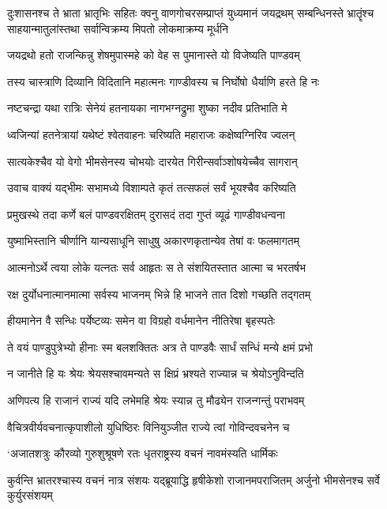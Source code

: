 दुःशासनश्च ते भ्राता भ्रातृभिः सहितः क्वनु
\threelineshloka
{वाणगोचरसम्प्राप्तं युध्यमानं जयद्रथम्}
{सम्बन्धिनस्ते भ्रातॄंश्च साहयान्मातुलांस्तथा}
{सर्वान्विक्रम्य मिपतो लोकमाक्रम्य मूर्धनि}


\twolineshloka
{जयद्रथो हतो राजन्किन्नु शेषमुपास्महे}
{को वेह स पुमानास्ते यो विजेष्यति पाण्डवम्}


\twolineshloka
{तस्य चास्त्राणि दिव्यानि विदितानि महात्मनः}
{गाण्डीवस्य च निर्घोषो धैर्याणि हरते हि नः}


\twolineshloka
{नष्टचन्द्रा यथा रात्रिः सेनेयं हतनायका}
{नागभग्नद्रुमा शुष्का नदीव प्रतिभाति मे}


\twolineshloka
{ध्वजिन्यां हतनेत्रायां यथेष्टं श्वेतवाहनः}
{चरिष्यति महाराजः कक्षेष्वग्निरिव ज्वलन्}


\twolineshloka
{सात्यकेश्चैव यो वेगो भीमसेनस्य चोभयोः}
{दारयेत गिरीन्सर्वाञ्शोषयेच्चैव सागरान्}


\twolineshloka
{उवाच वाक्यं यद्भीमः सभामध्ये विशाम्पते}
{कृतं तत्सफलं सर्वं भूयश्चैव करिष्यति}


\twolineshloka
{प्रमुखस्थे तदा कर्णे बलं पाण्डवरक्षितम्}
{दुरासदं तदा गुप्तं व्यूढं गाण्डीवधन्वना}


\twolineshloka
{युष्माभिस्तानि चीर्णानि यान्यसाधूनि साधुषु}
{अकारणकृतान्येव तेषां वः फलमागतम्}


\twolineshloka
{आत्मनोऽर्थे त्वया लोके यत्नतः सर्व आहृतः}
{स ते संशयितस्तात आत्मा च भरतर्षभ}


\twolineshloka
{रक्ष दुर्योधनात्मानमात्मा सर्वस्य भाजनम्}
{भिन्ने हि भाजने तात दिशो गच्छति तद्गतम्}


\twolineshloka
{हीयमानेन वै सन्धिः पर्येष्टव्यः समेन वा}
{विग्रहो वर्धमानेन नीतिरेषा बृहस्पतेः}


\twolineshloka
{ते वयं पाण्डुपुत्रेभ्यो हीनाः स्म बलशक्तितः}
{अत्र ते पाण्डवैः सार्धं सन्धिं मन्ये क्षमं प्रभो}


\twolineshloka
{न जानीते हि यः श्रेयः श्रेयसश्चावमन्यते}
{स क्षिप्रं भ्रश्यते राज्यान्न च श्रेयोऽनुविन्दति}


\twolineshloka
{अणिपत्य हि राजानं राज्यं यदि लभेमहि}
{श्रेयः स्यान्न तु मौढ्येन राजन्गन्तुं पराभवम्}


\twolineshloka
{वैचित्रवीर्यवचनात्कृपाशीलो युधिष्ठिरः}
{विनियुञ्जीत राज्ये त्वां गोविन्दवचनेन च}


\twolineshloka
{`अजातशत्रुः कौरव्यो गुरुशुश्रूषणे रतः}
{धृतराष्ट्रस्य वचनं नावमंस्यति धार्मिकः}


कुर्वन्ति भ्रातरश्चास्य वचनं नात्र संशयः
\twolineshloka
{यद्ब्रूयाद्धि हृषीकेशो राजानमपराजितम्}
{अर्जुनो भीमसेनश्च सर्वे कुर्युरसंशयम्}


